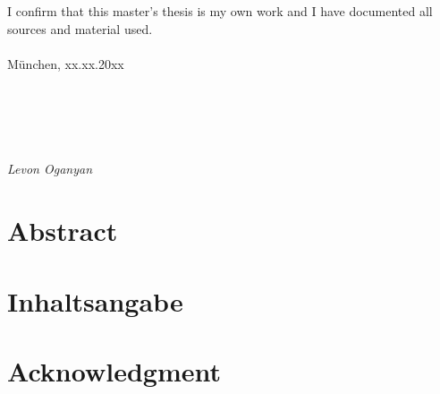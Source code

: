 \documentclass[12pt]{report}
\begin{document}
\newpage
\thispagestyle{empty}
\hoffset=0mm
\vspace*{\fill}
\noindent I confirm that this master's thesis is my own work and I have documented all sources and material used.\\\\
München, xx.xx.20xx\\\\\\\\\\\\
\noindent \textit{Levon Oganyan}

\newpage
\thispagestyle{empty}
\null

\newpage
\thispagestyle{empty}
\hoffset=0mm
\section*{Abstract}
\begin{spacing}{1.2}

\end{spacing}

\newpage
\thispagestyle{empty}
\hoffset=0mm
\section*{Inhaltsangabe}
\begin{spacing}{1.2}

\end{spacing}

\newpage
\thispagestyle{empty}
\hoffset=0mm
\section*{Acknowledgment}
\begin{spacing}{1.2}

\end{spacing}

\newpage
\setcounter{page}{1}
\hoffset=0mm
\fboxsep 0mm

\tableofcontents
\setcounter{tocdepth}{2}

\listoffigures
{}

\listoftables
{}

\printglossary[type=\acronymtype,style=long ,title=Abbreviations, toctitle=Abbreviations,nonumberlist]
\printglossary[type=symbolslist,style=long ,title=Symbols, nonumberlist]

\newpage
\setlength{\baselineskip}{3ex}
\begin{spacing}{1.15}






\end{spacing}

\newpage


\newpage


\end{document}
